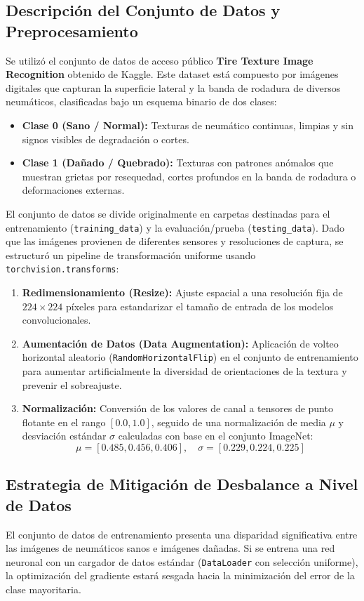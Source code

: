 \documentclass{article}
\begin{document}
\subsection{Descripción del Conjunto de Datos y Preprocesamiento}
Se utilizó el conjunto de datos de acceso público \textbf{Tire Texture Image Recognition} obtenido de Kaggle. Este dataset está compuesto por imágenes digitales que capturan la superficie lateral y la banda de rodadura de diversos neumáticos, clasificadas bajo un esquema binario de dos clases:
\begin{itemize}
    \item \textbf{Clase 0 (Sano / Normal):} Texturas de neumático continuas, limpias y sin signos visibles de degradación o cortes.
    \item \textbf{Clase 1 (Dañado / Quebrado):} Texturas con patrones anómalos que muestran grietas por resequedad, cortes profundos en la banda de rodadura o deformaciones externas.
\end{itemize}

El conjunto de datos se divide originalmente en carpetas destinadas para el entrenamiento (\texttt{training\_data}) y la evaluación/prueba (\texttt{testing\_data}). Dado que las imágenes provienen de diferentes sensores y resoluciones de captura, se estructuró un pipeline de transformación uniforme usando \texttt{torchvision.transforms}:
\begin{enumerate}
    \item \textbf{Redimensionamiento (Resize):} Ajuste espacial a una resolución fija de $224 \times 224$ píxeles para estandarizar el tamaño de entrada de los modelos convolucionales.
    \item \textbf{Aumentación de Datos (Data Augmentation):} Aplicación de volteo horizontal aleatorio (\texttt{RandomHorizontalFlip}) en el conjunto de entrenamiento para aumentar artificialmente la diversidad de orientaciones de la textura y prevenir el sobreajuste.
    \item \textbf{Normalización:} Conversión de los valores de canal a tensores de punto flotante en el rango $[0.0, 1.0]$, seguido de una normalización de media $\mu$ y desviación estándar $\sigma$ calculadas con base en el conjunto ImageNet:
    \[
    \mu = [0.485, 0.456, 0.406], \quad \sigma = [0.229, 0.224, 0.225]
    \]
\end{enumerate}

\subsection{Estrategia de Mitigación de Desbalance a Nivel de Datos}
El conjunto de datos de entrenamiento presenta una disparidad significativa entre las imágenes de neumáticos sanos e imágenes dañadas. Si se entrena una red neuronal con un cargador de datos estándar (\texttt{DataLoader} con selección uniforme), la optimización del gradiente estará sesgada hacia la minimización del error de la clase mayoritaria. 
\end{document}
